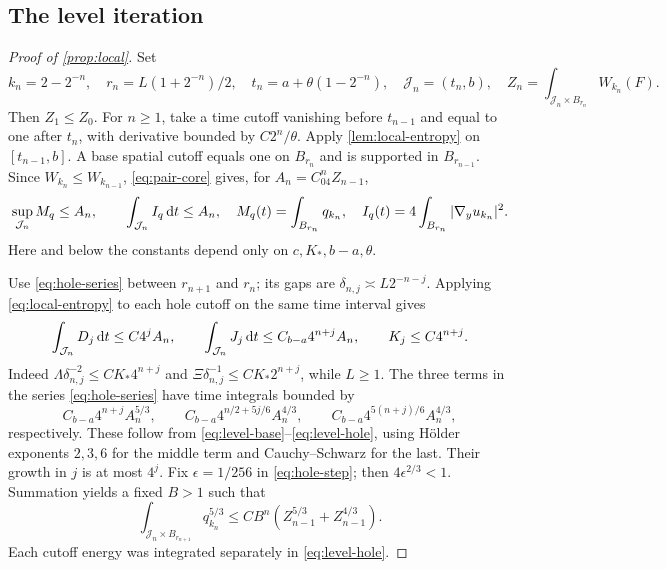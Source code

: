 \subsection{The level iteration}

\begin{proof}[Proof of \cref{prop:local}]
Set
\[
 k_n=2-2^{-n},\quad r_n=L(1+2^{-n})/2,\quad
 t_n=a+\theta(1-2^{-n}),\quad \mathcal J_n=(t_n,b),\quad
 Z_n=\int_{\mathcal J_n\times B_{r_n}}W_{k_n}(F).
\]
Then $Z_1\le Z_0$. For $n\ge1$, take a time cutoff vanishing before $t_{n-1}$ and equal to one after $t_n$, with derivative bounded by $C2^n/\theta$. Apply \cref{lem:local-entropy} on $[t_{n-1},b]$. A base spatial cutoff equals one on $B_{r_n}$ and is supported in $B_{r_{n-1}}$. Since $W_{k_n}\le W_{k_{n-1}}$, \eqref{eq:pair-core} gives, for $A_n=C_04^nZ_{n-1}$,
\begin{equation}\label{eq:level-base}
 \sup_{\mathcal J_n}M_q\le A_n,\qquad\int_{\mathcal J_n}I_q\,\mathrm dt\le A_n,
 \quad M_q(t)=\int_{B_{r_n}}q_{k_n},\quad I_q(t)=4\int_{B_{r_n}}|\nabla_yu_{k_n}|^2.
\end{equation}
Here and below the constants depend only on $c,K_*,b-a,\theta$.

Use \eqref{eq:hole-series} between $r_{n+1}$ and $r_n$; its gaps are $\delta_{n,j}\asymp L2^{-n-j}$. Applying \eqref{eq:local-entropy} to each hole cutoff on the same time interval gives
\begin{equation}\label{eq:level-hole}
 \int_{\mathcal J_n}D_j\,\mathrm dt\le C4^jA_n,\qquad
 \int_{\mathcal J_n}J_j\,\mathrm dt\le C_{b-a}4^{n+j}A_n,\qquad
 K_j\le C4^{n+j}.
\end{equation}
Indeed $\Lambda\delta_{n,j}^{-2}\le CK_*4^{n+j}$ and
$\Xi\delta_{n,j}^{-1}\le CK_*2^{n+j}$, while $L\ge1$.
The three terms in the series \eqref{eq:hole-series} have time integrals bounded by
\[
 C_{b-a}4^{n+j}A_n^{5/3},\qquad
 C_{b-a}4^{n/2+5j/6}A_n^{4/3},\qquad
 C_{b-a}4^{5(n+j)/6}A_n^{4/3},
\]
respectively. These follow from \eqref{eq:level-base}--\eqref{eq:level-hole}, using H\"older exponents $2,3,6$ for the middle term and Cauchy--Schwarz for the last. Their growth in $j$ is at most $4^j$. Fix $\epsilon=1/256$ in \eqref{eq:hole-step}; then $4\epsilon^{2/3}<1$. Summation yields a fixed $B>1$ such that
\[
 \int_{\mathcal J_n\times B_{r_{n+1}}}q_{k_n}^{5/3}
 \le CB^n(Z_{n-1}^{5/3}+Z_{n-1}^{4/3}).
\]
Each cutoff energy was integrated separately in \eqref{eq:level-hole}.


\end{proof}
